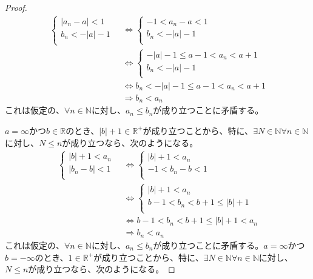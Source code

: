 \documentclass[dvipdfmx]{jsarticle}
\begin{document}
\begin{proof}
\begin{align*}
\left\{ \begin{matrix}
\left| a_{n} - a \right| < 1 \\
b_{n} < - |a| - 1 \\
\end{matrix} \right.\  &\Leftrightarrow \left\{ \begin{matrix}
 - 1 < a_{n} - a < 1 \\
b_{n} < - |a| - 1 \\
\end{matrix} \right.\ \\
&\Leftrightarrow \left\{ \begin{matrix}
 - |a| - 1 \leq a - 1 < a_{n} < a + 1 \\
b_{n} < - |a| - 1 \\
\end{matrix} \right.\ \\
&\Leftrightarrow b_{n} < - |a| - 1 \leq a - 1 < a_{n} < a + 1\\
&\Rightarrow b_{n} < a_{n}
\end{align*}
これは仮定の、$\forall n \in \mathbb{N}$に対し、$a_{n} \leq b_{n}$が成り立つことに矛盾する。\par
$a = \infty$かつ$b \in \mathbb{R}$のとき、$|b| + 1 \in \mathbb{R}^{+}$が成り立つことから、特に、$\exists N \in \mathbb{N}\forall n \in \mathbb{N}$に対し、$N \leq n$が成り立つなら、次のようになる。
\begin{align*}
\left\{ \begin{matrix}
|b| + 1 < a_{n} \\
\left| b_{n} - b \right| < 1 \\
\end{matrix} \right.\  &\Leftrightarrow \left\{ \begin{matrix}
|b| + 1 < a_{n} \\
 - 1 < b_{n} - b < 1 \\
\end{matrix} \right.\ \\
&\Leftrightarrow \left\{ \begin{matrix}
|b| + 1 < a_{n} \\
b - 1 < b_{n} < b + 1 \leq |b| + 1 \\
\end{matrix} \right.\ \\
&\Leftrightarrow b - 1 < b_{n} < b + 1 \leq |b| + 1 < a_{n}\\
&\Rightarrow b_{n} < a_{n}
\end{align*}
これは仮定の、$\forall n \in \mathbb{N}$に対し、$a_{n} \leq b_{n}$が成り立つことに矛盾する。$a = \infty$かつ$b = - \infty$のとき、$1 \in \mathbb{R}^{+}$が成り立つことから、特に、$\exists N \in \mathbb{N}\forall n \in \mathbb{N}$に対し、$N \leq n$が成り立つなら、次のようになる。

\end{proof}
\end{document}

